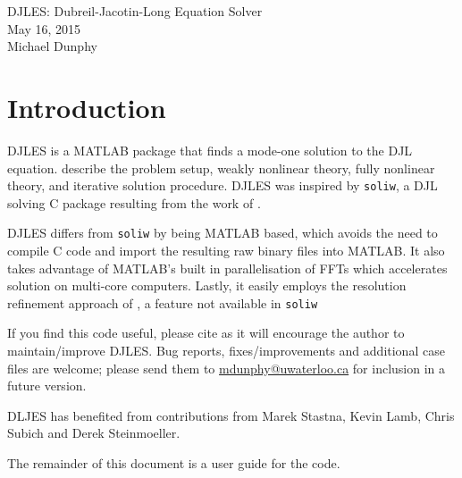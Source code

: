 \documentclass[letterpaper]{article}
\begin{document}
\newpage
\pagestyle{plain}
\setcounter{page}{1}

\begin{center}
\huge{DJLES: Dubreil-Jacotin-Long Equation Solver}\\[1em]
\large{May 16, 2015}\\
Michael Dunphy
\end{center}

\section{Introduction}
DJLES is a MATLAB package that finds a mode-one solution to the DJL equation. \cite{StastnaLamb2002} describe the problem setup, weakly nonlinear theory, fully nonlinear theory, and iterative solution procedure. DJLES was inspired by \verb+soliw+, a DJL solving C package resulting from the work of \cite{StastnaLamb2002}.

DJLES differs from \verb+soliw+ by being MATLAB based, which avoids the need to compile C code and import the resulting raw binary files into MATLAB. It also takes advantage of MATLAB's built in parallelisation of FFTs which accelerates solution on multi-core computers. Lastly, it easily employs the resolution refinement approach of \cite{DunphySubichStastna2011}, a feature not available in \verb+soliw+

If you find this code useful, please cite \cite{DunphySubichStastna2011} as it will encourage the author to maintain/improve DJLES. Bug reports, fixes/improvements and additional case files are welcome; please send them to \href{mailto:mdunphy@uwaterloo.ca}{mdunphy@uwaterloo.ca} for inclusion in a future version.

DLJES has benefited from contributions from Marek Stastna, Kevin Lamb, Chris Subich and Derek Steinmoeller.

The remainder of this document is a user guide for the code.
\end{document}

